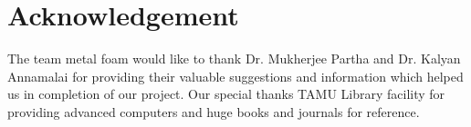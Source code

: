 \documentclass[compileTAMUreport.tex]{subfiles}
\begin{document}
\chapter{Acknowledgement} 

The team metal foam would like to thank Dr. Mukherjee Partha and Dr. Kalyan Annamalai for providing their valuable suggestions and information which helped us in completion of our project. Our special thanks  TAMU Library facility for providing advanced computers and huge books and journals for reference.
\end{document}
